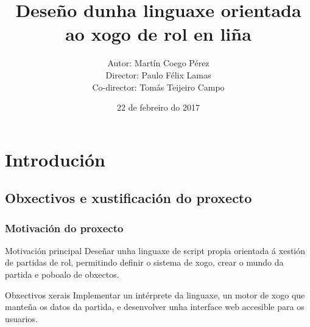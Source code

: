 \documentclass[12pt]{beamer}
\begin{document}
\title{Deseño dunha linguaxe orientada ao xogo de rol en liña}
\author[Martín Coego Pérez]{Autor: Martín Coego Pérez \\
Director: Paulo Félix Lamas \\
Co-director: Tomás Teijeiro Campo}
\date[2017]{22 de febreiro do 2017}




\begin{frame}[plain]
\titlepage
\end{frame}



\section{Introdución}

\subsection{Obxectivos e xustificación do proxecto}
\begin{frame}
\frametitle{Motivación do proxecto}
\begin{block}{Motivación principal}
Deseñar unha linguaxe de script propia orientada á xestión de partidas de rol,
permitindo definir o sistema de xogo, crear o mundo da partida e poboalo de
obxectos.
\end{block}
\begin{block}{Obxectivos xerais}
Implementar un intérprete da linguaxe, un motor de xogo que manteña os datos da
partida, e desenvolver unha interface web accesible para os usuarios.
\end{block}
\end{frame}
\end{document}
